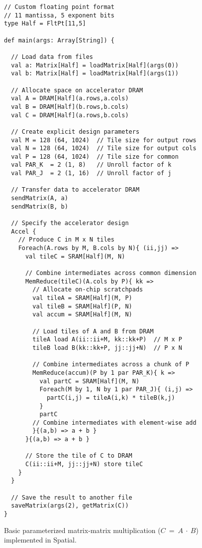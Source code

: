 \begin{figure}
\centering

\newsavebox{\gemm}
\begin{lrbox}{\gemm}
\begin{lstlisting}[language=Spatial,linewidth=0.88\columnwidth]
// Custom floating point format
// 11 mantissa, 5 exponent bits
type Half = FltPt[11,5]

def main(args: Array[String]) {

  // Load data from files
  val a: Matrix[Half] = loadMatrix[Half](args(0))
  val b: Matrix[Half] = loadMatrix[Half](args(1))

  // Allocate space on accelerator DRAM
  val A = DRAM[Half](a.rows,a.cols)
  val B = DRAM[Half](b.rows,b.cols)
  val C = DRAM[Half](a.rows,b.cols)

  // Create explicit design parameters
  val M = 128 (64, 1024)  // Tile size for output rows
  val N = 128 (64, 1024)  // Tile size for output cols
  val P = 128 (64, 1024)  // Tile size for common
  val PAR_K  = 2 (1, 8)   // Unroll factor of k 
  val PAR_J  = 2 (1, 16)  // Unroll factor of j

  // Transfer data to accelerator DRAM
  sendMatrix(A, a)
  sendMatrix(B, b)

  // Specify the accelerator design
  Accel {
    // Produce C in M x N tiles
    Foreach(A.rows by M, B.cols by N){ (ii,jj) =>
      val tileC = SRAM[Half](M, N)
      
      // Combine intermediates across common dimension
      MemReduce(tileC)(A.cols by P){ kk =>
        // Allocate on-chip scratchpads
        val tileA = SRAM[Half](M, P) 
        val tileB = SRAM[Half](P, N)
        val accum = SRAM[Half](M, N)
          
        // Load tiles of A and B from DRAM
        tileA load A(ii::ii+M, kk::kk+P)  // M x P
        tileB load B(kk::kk+P, jj::jj+N)  // P x N
        
        // Combine intermediates across a chunk of P
        MemReduce(accum)(P by 1 par PAR_K){ k =>
          val partC = SRAM[Half](M, N)
          Foreach(M by 1, N by 1 par PAR_J){ (i,j) =>
            partC(i,j) = tileA(i,k) * tileB(k,j)
          }
          partC
        // Combine intermediates with element-wise add
        }{(a,b) => a + b }
      }{(a,b) => a + b }

      // Store the tile of C to DRAM
      C(ii::ii+M, jj::jj+N) store tileC
    }
  }

  // Save the result to another file
  saveMatrix(args(2), getMatrix(C))
}
\end{lstlisting}
\end{lrbox}

\hspace{-15pt}\usebox{\gemm}
\caption{Basic parameterized matrix-matrix multiplication ($C$~=~$A~\cdot~B$) implemented in Spatial.
\vspace{-10pt}}
\label{fig:matmult}
\end{figure}  
